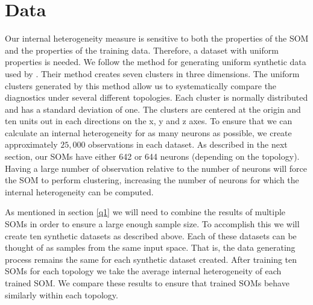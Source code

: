 \section{Data}
\label{meth:data}
Our internal heterogeneity measure is sensitive to both the properties of the SOM
and the properties of the training data. Therefore, a dataset with uniform
properties is needed. We follow the method for generating uniform synthetic
data used by \cite{wu2006}.  Their method creates seven clusters in three
dimensions.  The uniform clusters generated by this method allow us to
systematically compare the diagnostics under several different topologies.
Each cluster is normally distributed and has a standard deviation of one.  The
clusters are centered at the origin and ten units out in each directions on
the x, y and z axes. To ensure that we can calculate an internal heterogeneity
for as many neurons as possible, we create approximately $25,000$ observations
in each dataset.  As described in the next section, our SOMs have either 642
or 644 neurons (depending on the topology).  Having a large number of
observation relative to the number of neurons will force the SOM to perform
clustering, increasing the number of neurons for which the internal
heterogeneity can be computed.

As mentioned in section \ref{q1} we will need to combine the results of
multiple SOMs in order to ensure a large enough sample size.  To accomplish
this we will create ten synthetic datasets as described above.  Each of these
datasets can be thought of as samples from the same input space.  That is, the
data generating process remains the same for each synthetic dataset created.
After training ten SOMs for each topology we take the average internal
heterogeneity of each trained SOM.  We compare these results to ensure that
trained SOMs behave similarly within each topology.





